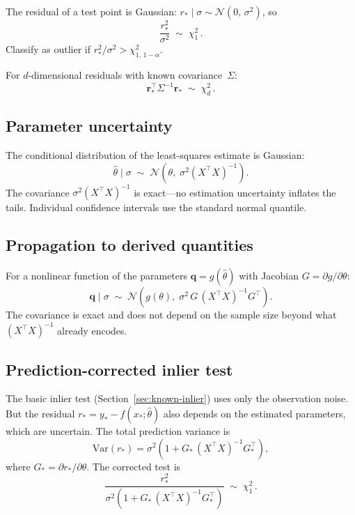 \documentclass[11pt]{article}
\newcommand{\Normal}{\mathcal{N}}
\begin{document}
The residual of a test point is Gaussian:
$r_* \mid \sigma \sim \Normal(0,\, \sigma^2)$, so
\begin{equation}
  \boxed{\frac{r_*^2}{\sigma^2} \;\sim\; \chi^2_1\,.}
\end{equation}
Classify as outlier if $r_*^2 / \sigma^2 > \chi^2_{1,\,1-\alpha}$.

For $d$-dimensional residuals with known covariance~$\Sigma$:
\begin{equation}
  \boxed{
    \mathbf{r}_*^\top \Sigma^{-1} \mathbf{r}_*
    \;\sim\; \chi^2_d\,.
  }
\end{equation}

\subsection{Parameter uncertainty}
\label{sec:known-param}

The conditional distribution of the least-squares estimate is Gaussian:
\begin{equation}
  \boxed{
    \hat\theta \mid \sigma
    \;\sim\; \Normal\!\left(\theta,\; \sigma^2 (X^\top X)^{-1}\right).
  }
\end{equation}
The covariance $\sigma^2 (X^\top X)^{-1}$ is exact---no estimation
uncertainty inflates the tails. Individual confidence intervals use
the standard normal quantile.

\subsection{Propagation to derived quantities}
\label{sec:known-prop}

For a nonlinear function of the parameters
$\mathbf{q} = g(\hat\theta)$ with Jacobian $G = \partial g / \partial \theta$:
\begin{equation}
  \boxed{
    \mathbf{q} \mid \sigma
    \;\sim\; \Normal\!\left(g(\theta),\;
      \sigma^2\, G\, (X^\top X)^{-1} G^\top\right).
  }
\end{equation}
The covariance is exact and does not depend on the sample size beyond
what $(X^\top X)^{-1}$ already encodes.

\subsection{Prediction-corrected inlier test}
\label{sec:known-pred}

The basic inlier test (Section~\ref{sec:known-inlier}) uses only the
observation noise. But the residual $r_* = y_* - f(x_*; \hat\theta)$
also depends on the estimated parameters, which are uncertain.
The total prediction variance is
\begin{equation}
  \mathrm{Var}(r_*) = \sigma^2 \left(1 + G_*\, (X^\top X)^{-1} G_*^\top\right),
\end{equation}
where $G_* = \partial r_* / \partial \theta$. The corrected test is
\begin{equation}
  \boxed{
    \frac{r_*^2}{\sigma^2(1 + G_*\, (X^\top X)^{-1} G_*^\top)}
    \;\sim\; \chi^2_1\,.
  }
\end{equation}
\end{document}
